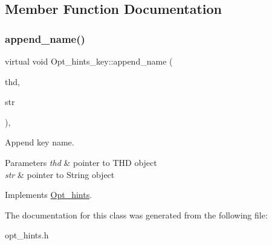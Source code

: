 \subsection{Member Function Documentation}
\mbox{\label{classOpt__hints__key_a2baec152bb32149f180b9ca545194318}} 
\subsubsection{\texorpdfstring{append\+\_\+name()}{append\_name()}}
{\footnotesize\ttfamily virtual void Opt\+\_\+hints\+\_\+key\+::append\+\_\+name (\begin{DoxyParamCaption}\item[{T\+HD $\ast$}]{thd,  }\item[{String $\ast$}]{str }\end{DoxyParamCaption})\hspace{0.3cm}{\ttfamily [inline]}, {\ttfamily [virtual]}}

Append key name.


\begin{DoxyParams}{Parameters}
{\em thd} & pointer to T\+HD object \\
\hline
{\em str} & pointer to String object \\
\hline
\end{DoxyParams}


Implements \mbox{\hyperlink{classOpt__hints}{Opt\+\_\+hints}}.



The documentation for this class was generated from the following file\+:\begin{DoxyCompactItemize}
\item 
opt\+\_\+hints.\+h\end{DoxyCompactItemize}
